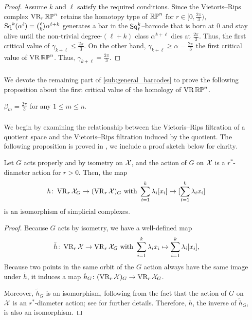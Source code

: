 \begin{proof} 
        Assume $k$ and $\ell$ satisfy the required conditions.
	Since the Vietoris--Rips complex $\operatorname{VR}_r\mathbb{RP}^n$ retains the homotopy type of $\mathbb{RP}^n$ for $r \in [0,\tfrac{2\pi}{3})$, $\operatorname{Sq}^k(\alpha^\ell) = \binom{\ell}{k}\alpha^{\ell+k}$ generates a bar in the $\operatorname{Sq}^k_\ell$--barcode that is born at $0$ and stay alive until the non-trivial degree-$(\ell+k)$ class $\alpha^{k+\ell}$ dies at $\tfrac{2\pi}{3}$.
        Thus, the first critical value of $\gamma_{k+\ell} \leq \tfrac{2\pi}{3}$.
        On the other hand, $\gamma_{k+\ell} \geq \alpha = \tfrac{2\pi}{3}$ the first critical value of $\operatorname{VR}\mathbb{RP}^n$.
        Thus, $\gamma_{k+\ell} = \tfrac{2\pi}{3}$.
\end{proof}

\subsubsection{}
\label{subsub:beta_m_rpn}
We devote the remaining part of \cref{sub:general_barcodes} to prove the following proposition about the first critical value of the homology of $\operatorname{VR}\mathbb{RP}^n$.

\medskip\proposition 
$\beta_m=\frac{2\pi}{3}$ for any $1\leq m\leq n$.

\subsubsection{}
\label{subsub:h}

We begin by examining the relationship between the Vietoris--Rips filtration of a quotient space and the Vietoris--Rips filtration induced by the quotient.
The following proposition is proved in \cite[Proposition 3.5]{adams2022metric}, we include a proof sketch below for clarity.

\medskip\lemma
Let $G$ acts properly and by isometry on $\mathcal{X}$, and the action of $G$ on $\mathcal{X}$ is a $r^*$-diameter action for $r>0$. Then, the map
\[
    h \colon \operatorname{VR}_r\mathcal{X}_G \to (\operatorname{VR}_r\mathcal{X})_G
    \text{ with }
    \sum_{i=1}^k \lambda_i [x_i] \mapsto [\sum_{i=1}^k \lambda_i x_i]
\]
is an isomorphism of simplicial complexes.

\begin{proof}       
        Because $G$ acts by isometry, we have a well-defined map 
        \[
        \tilde{h} \colon \operatorname{VR}_r\mathcal{X} \to \operatorname{VR}_r\mathcal{X}_G 
        \text{ with }
        \sum_{i=1}^k \lambda_i x_i \mapsto \sum_{i=1}^k \lambda_i [x_i],
        \]
        Because two points in the same orbit of the $G$ action always have the same image under $\tilde{h}$, it induces a map $\tilde{h}_G \colon (\operatorname{VR}_r\mathcal{X})_G \to \operatorname{VR}_r\mathcal{X}_G$.
        
        Moreover, $\tilde{h}_G$ is an isomorphism, following from the fact that the action of $G$ on $\mathcal{X}$ is an $r^*$-diameter action; see \cite[Proposition 3.5]{adams2022metric} for further details.
        Therefore, $h$, the inverse of $\tilde{h}_G$, is also an isomorphism.
\end{proof}

